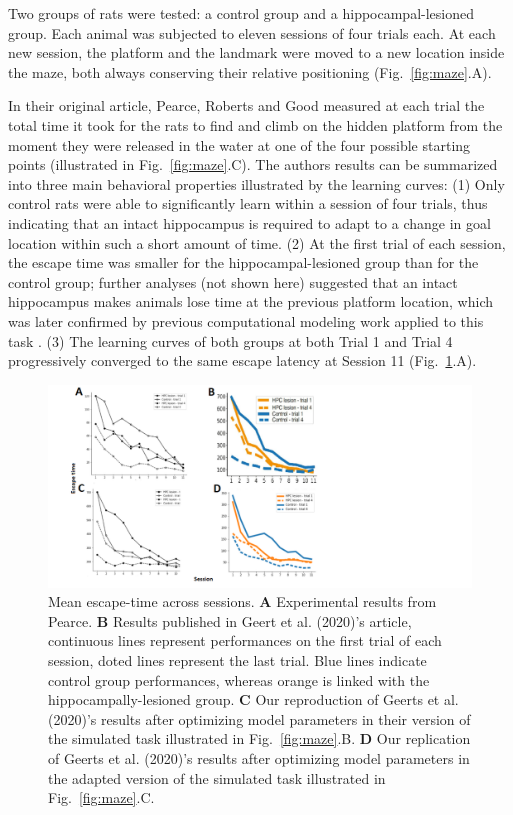 Two groups of rats were tested: a control group and a hippocampal-lesioned group. Each animal was subjected to eleven sessions of four trials each. At each new session, the platform and the landmark were moved to a new location inside the maze, both always conserving their relative positioning (Fig.~\ref{fig:maze}.A).

In their original article, Pearce, Roberts and Good \cite{Pearce:1998} measured at each trial the total time it took for the rats to find and climb on the hidden platform from the moment they were released in the water at one of the four possible starting points (illustrated in Fig.~\ref{fig:maze}.C).  The authors results can be summarized into three main behavioral properties illustrated by the learning curves: (1) Only control rats were able to significantly learn within a session of four trials, thus indicating that an intact hippocampus is required to adapt to a change in goal location within such a short amount of time. (2) At the first trial of each session, the escape time was smaller for the hippocampal-lesioned group than for the control group; further analyses (not shown here) suggested that an intact hippocampus makes animals lose time at the previous platform location, which was later confirmed by previous computational modeling work applied to this task \cite{Dolle:2018}. (3) The learning curves of both groups at both Trial 1 and Trial 4 progressively converged to the same escape latency at Session 11 (Fig.~\ref{fig:learningCurves}.A).


\begin{figure}[htp]
    \centering
    \includegraphics[width=20cm]{results.png}
    \caption{Mean escape-time across sessions. 
    {\bf A} Experimental results from Pearce. 
    {\bf B} Results published in Geert et al. (2020)'s article, continuous lines represent performances on the first trial of each session, doted lines represent the last trial. Blue lines indicate control group performances, whereas orange is linked with the hippocampally-lesioned group. 
    {\bf C} Our reproduction of Geerts et al. (2020)'s results after optimizing model parameters in their version of the simulated task illustrated in Fig.~\ref{fig:maze}.B.
    {\bf D} Our replication of Geerts et al. (2020)'s results after optimizing model parameters in the adapted version of the simulated task illustrated in Fig.~\ref{fig:maze}.C.}
    \label{fig:learningCurves}
\end{figure}

